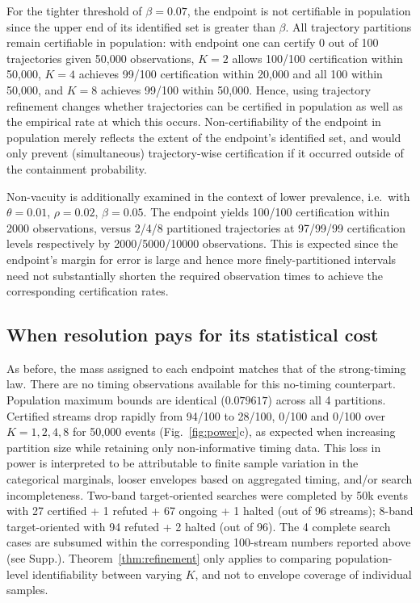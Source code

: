 For the tighter threshold of $\beta=0.07$, the endpoint is not certifiable in population since the upper end of its identified set is greater than $\beta$. All trajectory partitions remain certifiable in population: with endpoint one can certify 0 out of 100 trajectories given 50,000 observations, $K=2$ allows 100/100 certification within 50,000, $K=4$ achieves 99/100 certification within 20,000 and all 100 within 50,000, and $K=8$ achieves 99/100 within 50,000. Hence, using trajectory refinement changes whether trajectories can be certified in population as well as the empirical rate at which this occurs. Non-certifiability of the endpoint in population merely reflects the extent of the endpoint's identified set, and would only prevent (simultaneous) trajectory-wise certification if it occurred outside of the containment probability.

Non-vacuity is additionally examined in the context of lower prevalence, i.e.\ with $\theta=0.01$, $\rho=0.02$, $\beta=0.05$. The endpoint yields 100/100 certification within 2000 observations, versus 2/4/8 partitioned trajectories at 97/99/99 certification levels respectively by 2000/5000/10000 observations. This is expected since the endpoint's margin for error is large and hence more finely-partitioned intervals need not substantially shorten the required observation times to achieve the corresponding certification rates.

\subsection{When resolution pays for its statistical cost}
As before, the mass assigned to each endpoint matches that of the strong-timing law. There are no timing observations available for this no-timing counterpart. Population maximum bounds are identical ($0.079617$) across all 4 partitions. Certified streams drop rapidly from 94/100 to 28/100, 0/100 and 0/100 over $K=1,2,4,8$ for 50,000 events (Fig.~\ref{fig:power}c), as expected when increasing partition size while retaining only non-informative timing data. This loss in power is interpreted to be attributable to finite sample variation in the categorical marginals, looser envelopes based on aggregated timing, and/or search incompleteness. Two-band target-oriented searches were completed by 50k events with 27 certified + 1 refuted + 67 ongoing + 1 halted (out of 96 streams); 8-band target-oriented with 94 refuted + 2 halted (out of 96). The 4 complete search cases are subsumed within the corresponding 100-stream numbers reported above (see Supp.). Theorem~\ref{thm:refinement} only applies to comparing population-level identifiability between varying $K$, and not to envelope coverage of individual samples.

